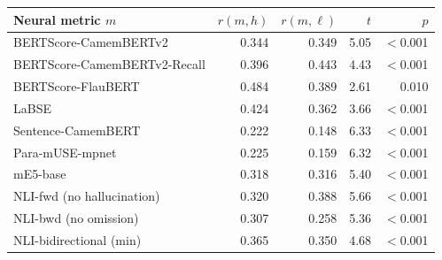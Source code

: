 \begin{tabular}{lrrrr}
\toprule
Neural metric $m$ & $r(m,h)$ & $r(m,\ell)$ & $t$ & $p$ \\
\midrule
BERTScore-CamemBERTv2 & 0.344 & 0.349 & 5.05 & $<$0.001 \\
BERTScore-CamemBERTv2-Recall & 0.396 & 0.443 & 4.43 & $<$0.001 \\
BERTScore-FlauBERT & 0.484 & 0.389 & 2.61 & 0.010 \\
LaBSE & 0.424 & 0.362 & 3.66 & $<$0.001 \\
Sentence-CamemBERT & 0.222 & 0.148 & 6.33 & $<$0.001 \\
Para-mUSE-mpnet & 0.225 & 0.159 & 6.32 & $<$0.001 \\
mE5-base & 0.318 & 0.316 & 5.40 & $<$0.001 \\
NLI-fwd (no hallucination) & 0.320 & 0.388 & 5.66 & $<$0.001 \\
NLI-bwd (no omission) & 0.307 & 0.258 & 5.36 & $<$0.001 \\
NLI-bidirectional (min) & 0.365 & 0.350 & 4.68 & $<$0.001 \\
\bottomrule
\end{tabular}